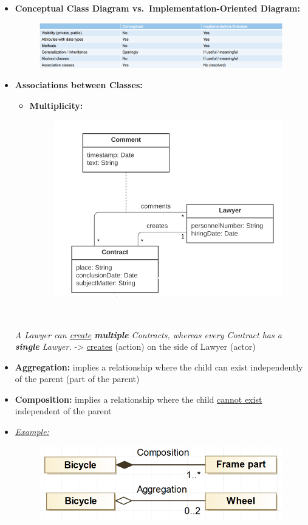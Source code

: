 \documentclass[ieeetran]{article}
\begin{document}
\begin{itemize}
\item \textbf{Conceptual Class Diagram vs.\ Implementation-Oriented Diagram:}
\begin{figure}[h!]
  \centering
  \includegraphics[width=1.0\linewidth]{umlcomparison.png}
  \label{fig:umlcomparison_png}
\end{figure}
\item \textbf{Associations between Classes:}

\pagebreak

\begin{itemize}
  \item \textbf{Multiplicity:}
	  \begin{figure}[h!]
	    \centering
	    \includegraphics[width=0.5\linewidth]{umlmultiplicity.png}
	    \label{fig:umlmultiplicity_png}
	  \end{figure}
	  \\
	  \end{itemize}
	  \textit{
A Lawyer can \underline{create} \textbf{multiple} Contracts, whereas every Contract has a \textbf{single} Lawyer.
} -> \underline{creates} (action) on the side of Lawyer (actor)

\item \textbf{Aggregation:} implies a relationship where the child can exist independently of the parent (part of the parent)
\item \textbf{Composition:} implies a relationship where the child \underline{cannot exist} independent of the parent

\item  \textit{\underline{Example:}}
	\begin{figure}[h!]
	  \centering
	  \includegraphics[width=0.4\linewidth]{compagg.png}
	  \label{fig:compagg_png}
	\end{figure}

\end{itemize}
\end{document}
